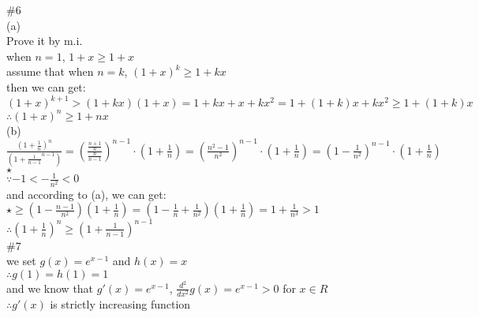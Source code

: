 \documentclass{article}
\begin{document}
\textcolor[rgb]{0.00,0.00,0.50}{\#6}\\

(a)\\

Prove it by m.i.\\

when $n=1$, $1+x\geq1+x$\\

assume that when $n=k$, $(1+x)^k\geq1+kx$\\

then we can get: $(1+x)^{k+1}>(1+kx)(1+x)=1+kx+x+kx^2=1+(1+k)x+kx^2\geq1+(1+k)x$\\

$\therefore$\qquad$(1+x)^n\geq1+nx$\\

(b)\\

$\displaystyle\frac{\left(1+\frac{1}{n}\right)^n}{\left(1+\frac{1}{n-1}^{n-1}\right)}=\left(\frac{\frac{n+1}{n}}{\frac{n}{n-1}}\right)^{n-1}\cdot\left(1+\frac{1}{n}\right)=\left(\frac{n^2-1}{n^2}\right)^{n-1}\cdot\left(1+\frac{1}{n}\right)=\left(1-\frac{1}{n^2}\right)^{n-1}\cdot\left(1+\frac{1}{n}\right)$\qquad$\star$\\

$\because$\qquad $-1<-\displaystyle\frac{1}{n^2}<0$\\

and according to (a), we can get:\\

$\displaystyle\star\geq\left(1-\frac{n-1}{n^2}\right)\left(1+\frac{1}{n}\right)=\left(1-\frac{1}{n}+\frac{1}{n^2}\right)\left(1+\frac{1}{n}\right)=1+\frac{1}{n^3}>1$\\

$\therefore$\qquad$\displaystyle\left(1+\frac{1}{n}\right)^n\geq\left(1+\frac{1}{n-1}\right)^{n-1}$\\

\textcolor[rgb]{0.00,0.00,0.50}{\#7}\\

we set $g(x)=e^{x-1}$ and $h(x)=x$\\

$\therefore$\qquad$g(1)=h(1)=1$\\

and we know that $g'(x)=e^{x-1}$, $\displaystyle\frac{d^2}{dx^2}g(x)=e^{x-1}>0$ for $x\in R$\\

$\therefore$\qquad $g'(x)$ is strictly increasing function\\
\end{document}
